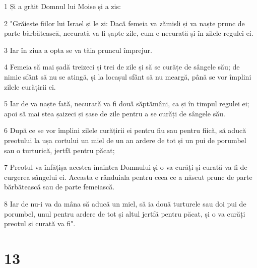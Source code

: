 \par 1 Și a grăit Domnul lui Moise și a zis:
\par 2 "Grăiește fiilor lui Israel și le zi: Dacă femeia va zămisli și va naște prunc de parte bărbătească, necurată va fi șapte zile, cum e necurată și în zilele regulei ei.
\par 3 Iar în ziua a opta se va tăia pruncul împrejur.
\par 4 Femeia să mai șadă treizeci și trei de zile și să se curățe de sângele său; de nimic sfânt să nu se atingă, și la locașul sfânt să nu meargă, până se vor împlini zilele curățirii ei.
\par 5 Iar de va naște fată, necurată va fi două săptămâni, ca și în timpul regulei ei; apoi să mai stea șaizeci și șase de zile pentru a se curăți de sângele său.
\par 6 După ce se vor împlini zilele curățirii ei pentru fiu sau pentru fiică, să aducă preotului la ușa cortului un miel de un an ardere de tot și un pui de porumbel sau o turturică, jertfă pentru păcat;
\par 7 Preotul va înfățișa acestea înaintea Domnului și o va curăți și curată va fi de curgerea sângelui ei. Aceasta e rânduiala pentru ceea ce a născut prunc de parte bărbătească sau de parte femeiască.
\par 8 Iar de nu-i va da mâna să aducă un miel, să ia două turturele sau doi pui de porumbel, unul pentru ardere de tot și altul jertfă pentru păcat, și o va curăți preotul și curată va fi".

\chapter{13}

